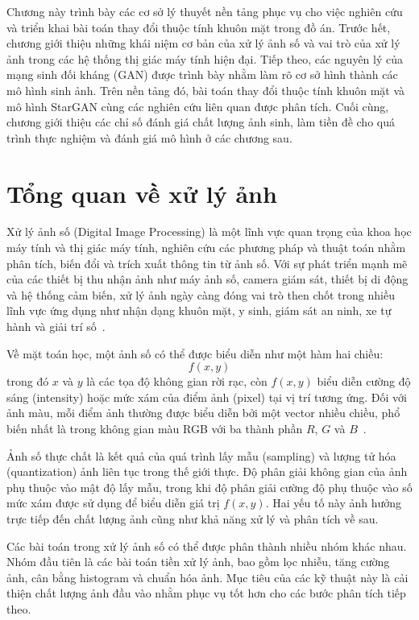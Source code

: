 \documentclass[../DoAn.tex]{subfiles}
\begin{document}
Chương này trình bày các cơ sở lý thuyết nền tảng phục vụ cho việc nghiên cứu và triển khai bài toán thay đổi thuộc tính khuôn mặt trong đồ án. Trước hết, chương giới thiệu những khái niệm cơ bản của xử lý ảnh số và vai trò của xử lý ảnh trong các hệ thống thị giác máy tính hiện đại. Tiếp theo, các nguyên lý của mạng sinh đối kháng (GAN) được trình bày nhằm làm rõ cơ sở hình thành các mô hình sinh ảnh. Trên nền tảng đó, bài toán thay đổi thuộc tính khuôn mặt và mô hình StarGAN cùng các nghiên cứu liên quan được phân tích. Cuối cùng, chương giới thiệu các chỉ số đánh giá chất lượng ảnh sinh, làm tiền đề cho quá trình thực nghiệm và đánh giá mô hình ở các chương sau.






\section{Tổng quan về xử lý ảnh}
\label{section:2.1}

Xử lý ảnh số (Digital Image Processing) là một lĩnh vực quan trọng của khoa học máy tính và thị giác máy tính, nghiên cứu các phương pháp và thuật toán nhằm phân tích, biến đổi và trích xuất thông tin từ ảnh số. Với sự phát triển mạnh mẽ của các thiết bị thu nhận ảnh như máy ảnh số, camera giám sát, thiết bị di động và hệ thống cảm biến, xử lý ảnh ngày càng đóng vai trò then chốt trong nhiều lĩnh vực ứng dụng như nhận dạng khuôn mặt, y sinh, giám sát an ninh, xe tự hành và giải trí số~\cite{gonzalez2018digital}.

Về mặt toán học, một ảnh số có thể được biểu diễn như một hàm hai chiều:
\[
f(x, y)
\]
trong đó \(x\) và \(y\) là các tọa độ không gian rời rạc, còn \(f(x, y)\) biểu diễn cường độ sáng (intensity) hoặc mức xám của điểm ảnh (pixel) tại vị trí tương ứng. Đối với ảnh màu, mỗi điểm ảnh thường được biểu diễn bởi một vector nhiều chiều, phổ biến nhất là trong không gian màu RGB với ba thành phần \(R\), \(G\) và \(B\)~\cite{gonzalez2018digital}.

Ảnh số thực chất là kết quả của quá trình lấy mẫu (sampling) và lượng tử hóa (quantization) ảnh liên tục trong thế giới thực. Độ phân giải không gian của ảnh phụ thuộc vào mật độ lấy mẫu, trong khi độ phân giải cường độ phụ thuộc vào số mức xám được sử dụng để biểu diễn giá trị \(f(x, y)\). Hai yếu tố này ảnh hưởng trực tiếp đến chất lượng ảnh cũng như khả năng xử lý và phân tích về sau.

Các bài toán trong xử lý ảnh số có thể được phân thành nhiều nhóm khác nhau. Nhóm đầu tiên là các bài toán tiền xử lý ảnh, bao gồm lọc nhiễu, tăng cường ảnh, cân bằng histogram và chuẩn hóa ảnh. Mục tiêu của các kỹ thuật này là cải thiện chất lượng ảnh đầu vào nhằm phục vụ tốt hơn cho các bước phân tích tiếp theo.
\end{document}
